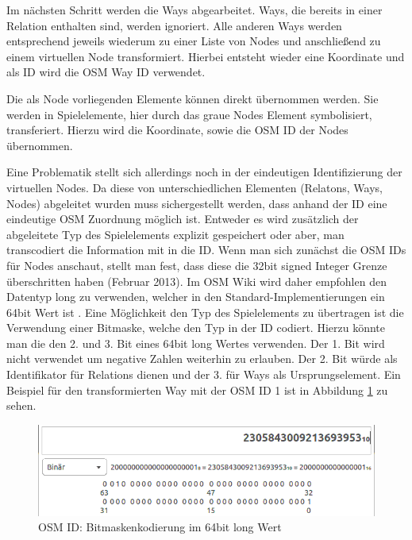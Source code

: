 Im nächsten Schritt werden die Ways abgearbeitet. Ways, die bereits in einer Relation enthalten sind, werden ignoriert. Alle anderen Ways werden entsprechend jeweils wiederum zu einer Liste von Nodes und anschließend zu einem virtuellen Node transformiert. Hierbei entsteht wieder eine Koordinate und als ID wird die OSM Way ID verwendet.

Die als Node vorliegenden Elemente können direkt übernommen werden. Sie werden in Spielelemente, hier durch das graue Nodes Element symbolisiert, transferiert. Hierzu wird die Koordinate, sowie die OSM ID der Nodes übernommen.

Eine Problematik stellt sich allerdings noch in der eindeutigen Identifizierung der virtuellen Nodes. Da diese von unterschiedlichen Elementen (Relatons, Ways, Nodes) abgeleitet wurden muss sichergestellt werden, dass anhand der ID eine eindeutige OSM Zuordnung möglich ist.
Entweder es wird zusätzlich der abgeleitete Typ des Spielelements explizit gespeichert oder aber, man transcodiert die Information mit in die ID.
Wenn man sich zunächst die OSM IDs für Nodes anschaut, stellt man fest, dass diese die 32bit signed Integer Grenze überschritten haben (Februar 2013). Im OSM Wiki wird daher empfohlen den Datentyp long zu verwenden, welcher in den Standard-Implementierungen ein 64bit Wert ist \cite{OSM.2013b}.
Eine Möglichkeit den Typ des Spielelements zu übertragen ist die Verwendung einer Bitmaske, welche den Typ in der ID codiert. Hierzu könnte man die den 2. und 3. Bit eines 64bit long Wertes verwenden. Der 1. Bit wird nicht verwendet um negative Zahlen weiterhin zu erlauben. Der 2. Bit würde als Identifikator für Relations dienen und der 3. für Ways als Ursprungselement. Ein Beispiel für den transformierten Way mit der OSM ID 1 ist in Abbildung \ref{img:ch5_img03_bitmask} zu sehen.

\begin{figure}[H]
\begin{center}
\includegraphics[width=120mm]{images/ch5_img03_bitmask.png}
\caption{OSM ID: Bitmaskenkodierung im 64bit long Wert}
\label{img:ch5_img03_bitmask}
\end{center}
\end{figure}


